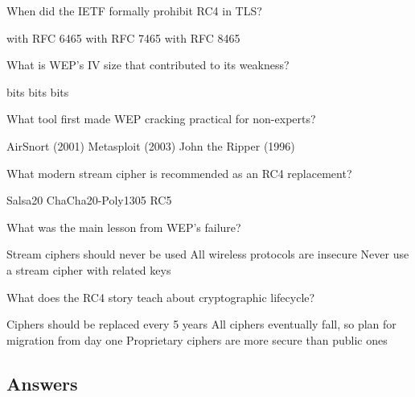 \documentclass[10pt,a4paper,american]{exam}
\begin{document}
\begin{questions}
	\question When did the IETF formally prohibit RC4 in TLS?
	\begin{randomizechoices}
		 with RFC 6465
		 with RFC 7465
		 with RFC 8465
	\end{randomizechoices}

	\question What is WEP's IV size that contributed to its weakness?
	\begin{randomizechoices}
		 bits
		 bits
		 bits
	\end{randomizechoices}

	\question What tool first made WEP cracking practical for non-experts?
	\begin{randomizechoices}
		\CorrectChoice AirSnort (2001)
		\choice Metasploit (2003)
		\choice John the Ripper (1996)
	\end{randomizechoices}

	\question What modern stream cipher is recommended as an RC4 replacement?
	\begin{randomizechoices}
		\choice Salsa20
		\CorrectChoice ChaCha20-Poly1305
		\choice RC5
	\end{randomizechoices}

	\question What was the main lesson from WEP's failure?
	\begin{randomizechoices}
		\choice Stream ciphers should never be used
		\choice All wireless protocols are insecure
		\CorrectChoice Never use a stream cipher with related keys
	\end{randomizechoices}

	\question What does the RC4 story teach about cryptographic lifecycle?
	\begin{randomizechoices}
		\choice Ciphers should be replaced every 5 years
		\CorrectChoice All ciphers eventually fall, so plan for migration from day one
		\choice Proprietary ciphers are more secure than public ones
	\end{randomizechoices}

\end{questions}

\clearpage

\subsection*{Answers}
\printkeytable
\end{document}
